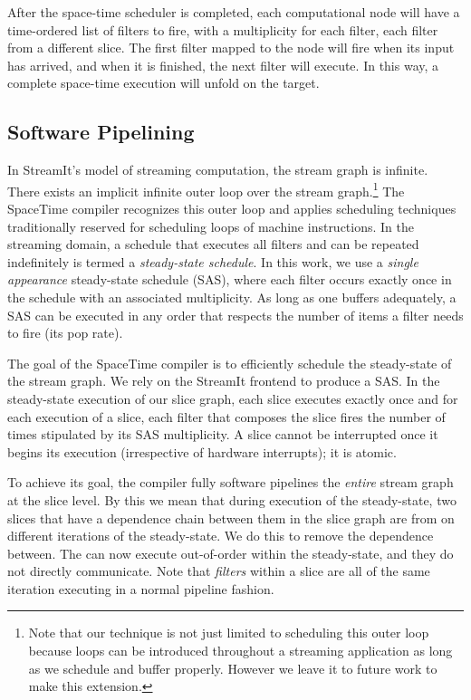 After the space-time scheduler is completed, each computational node
will have a time-ordered list of filters to fire, with a multiplicity
for each filter, each filter from a different slice.  The first
filter mapped to the node will fire when its input has arrived, and
when it is finished, the next filter will execute.  In this way, a
complete space-time execution will unfold on the target.

\subsection{Software Pipelining}
\label{sec:softpipe}
In StreamIt's model of streaming computation, the stream graph is
infinite.  There exists an implicit infinite outer loop over the
stream graph.\footnote{Note that our technique is not just limited to
scheduling this outer loop because loops can be introduced throughout
a streaming application as long as we schedule and buffer properly.
However we leave it to future work to make this extension.}  The
SpaceTime compiler recognizes this outer loop and applies scheduling
techniques traditionally reserved for scheduling loops of machine
instructions.  In the streaming domain, a schedule that executes all
filters and can be repeated indefinitely is termed a {\it steady-state
schedule}.  In this work, we use a {\it single appearance}
steady-state schedule (SAS), where each filter occurs exactly once in
the schedule with an associated multiplicity.  As long as one buffers
adequately, a SAS can be executed in any order that respects the
number of items a filter needs to fire (its pop rate).

The goal of the SpaceTime compiler is to efficiently schedule the
steady-state of the stream graph.  We rely on the StreamIt frontend to
produce a SAS.  In the steady-state execution of our slice graph, each
slice executes exactly once and for each execution of a slice, each
filter that composes the slice fires the number of times stipulated by
its SAS multiplicity.  A slice cannot be interrupted once it begins
its execution (irrespective of hardware interrupts); it is atomic.

To achieve its goal, the compiler fully software pipelines the {\it
entire} stream graph at the slice level. By this we mean that during
execution of the steady-state, two slices that have a dependence chain
between them in the slice graph are from on different iterations of
the steady-state.  We do this to remove the dependence between.  The
can now execute out-of-order within the steady-state, and they do not
directly communicate.  Note that {\it filters} within a slice are all of the
same iteration executing in a normal pipeline fashion.

